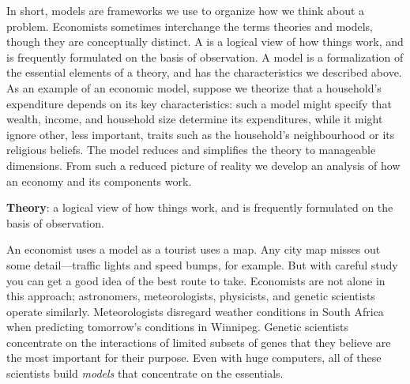 In short, models are frameworks we use to organize how we think about a problem. Economists sometimes interchange the terms theories and models, though they are conceptually distinct. A  is a logical view of how things work, and is frequently formulated on the basis of observation.  A model is a formalization of the essential elements of a theory, and has the characteristics we described above. As an example of an economic model, suppose we theorize that a household's expenditure depends on its key characteristics: such a model might specify that wealth, income, and household size determine its expenditures, while it might ignore other, less important, traits such as the household's neighbourhood or its religious beliefs. The model reduces and simplifies the theory to manageable dimensions. From such a reduced picture of reality we develop an analysis of how an economy and its components work.

\begin{DefBox}
\textbf{Theory}: a logical view of how things work, and is frequently formulated on the basis of observation.  
\end{DefBox}

An economist uses a model as a tourist uses a map. Any city map misses out some detail---traffic lights and speed bumps, for example. But with careful study you can get a good idea of the best route to take. Economists are not alone in this approach; astronomers, meteorologists, physicists, and genetic scientists operate similarly. Meteorologists disregard weather conditions in South Africa when predicting tomorrow's conditions in Winnipeg. Genetic scientists concentrate on the interactions of limited subsets of genes that they believe are the most important for their purpose.  Even with huge computers, all of these scientists build \textit{models} that concentrate on the essentials.
